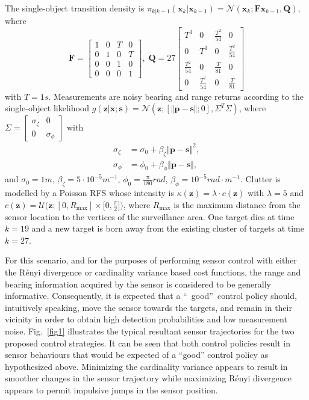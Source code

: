 \documentclass[twocolumn]{autart}
\begin{document}
The single-object transition density is $\pi _{k|k-1}(\mathbf{x}_{k}|\mathbf{x}_{k-1})=\mathcal{N}(\mathbf{x}_{k};\mathbf{F}\mathbf{x}_{k-1},\mathbf{Q})$, where
\begin{equation*}
\mathbf{F}=\begin{bmatrix}
1 & 0 & T & 0 \\
0 & 1 & 0 & T \\
0 & 0 & 1 & 0 \\
0 & 0 & 0 & 1\end{bmatrix},\;\mathbf{Q}=27\begin{bmatrix}
T^{3} & 0 & \frac{T^{2}}{54} & 0 \\
0 & T^{3} & 0 & \frac{T^{2}}{54} \\
\frac{T^{2}}{54} & 0 & \frac{T}{81} & 0 \\
0 & \frac{T^{2}}{54} & 0 & \frac{T}{81}\end{bmatrix}\end{equation*}with $T=1s$. Measurements are noisy bearing and range returns according to
the single-object likelihood $g(\mathbf{z}|\mathbf{x};\mathbf{s})=\mathcal{N}(\mathbf{z};[\Vert \mathbf{p}-\mathbf{s}\Vert ;0],\Sigma ^{T}\Sigma )$, where $\Sigma =\begin{bmatrix}
\sigma _{\zeta } & 0 \\
0 & \sigma _{\phi }\end{bmatrix}$ with
\begin{align}
\sigma _{\zeta }& =\sigma _{0}+\beta _{\zeta }\Vert \mathbf{p}-\mathbf{s}\Vert ^{2}, \\
\sigma _{\phi }& =\phi _{0}+\beta _{\phi }\Vert \mathbf{p}-\mathbf{s}\Vert ,
\end{align}and $\sigma _{0}=1m$, $\beta _{\zeta }=5\cdot 10^{-5}m^{-1}$, $\phi _{0}=\frac{\pi }{180}rad$, $\beta _{\phi }=10^{-5}rad{\cdot }m^{-1}$. Clutter is
modelled by a Poisson RFS whose intensity is $\kappa (\mathbf{z})=\lambda \cdot
c(\mathbf{z})$ with $\lambda =5$ and $c(\mathbf{z})=\mathcal{U(}\mathbf{z};[0,R_{\text{max}}]\times \lbrack 0,\frac{\pi }{2}])$, where $R_{\text{max}}$
is the maximum distance from the sensor location to the vertices of the
surveillance area. One target dies at time $k=19$ and a new target is born away from the existing cluster of targets at time $k=27$.

For this scenario, and for the purposes of performing sensor control with either the R\'{e}nyi divergence or cardinality variance based cost functions, the range
and bearing information acquired by the sensor is considered to be generally
informative. Consequently, it is expected that a \textquotedblleft\
good\textquotedblright\ control policy should, intuitively speaking, move
the sensor towards the targets, and remain in their vicinity in order to
obtain high detection probabilities and low measurement noise. Fig.~\ref{fig1} illustrates the
typical resultant sensor trajectories for the two proposed control
strategies. It can be seen that both control policies result in sensor behaviours that would be
expected of a ``good'' control policy as hypothesized above. Minimizing the cardinality variance appears to result in
smoother changes in the sensor trajectory while maximizing R\'{e}nyi divergence
appears to permit impulsive jumps in the sensor position.
\end{document}
